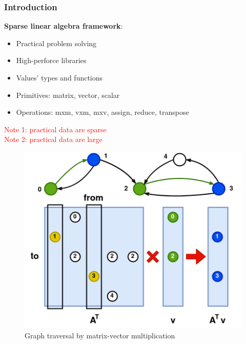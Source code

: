 \documentclass[aspectratio=169,xcolor=table,english]{beamer}
\begin{document}
\begin{frame}[fragile] \frametitle{Introduction}
    \begin{minipage}[m]{0.5\linewidth}
        \textbf{Sparse linear algebra framework}:
        \begin{itemize}
            \item Practical problem solving
            \item High-perforce libraries
            \item Values' types and functions
            \item Primitives: matrix, vector, scalar
            \item Operations: mxm, vxm, mxv, assign, reduce, transpose
        \end{itemize}
        \vspace{0.2cm}
        \textcolor{red}{Note 1: practical data are sparse\\Note 2: practical data are large}
    \end{minipage}\hfill
    \begin{minipage}[m]{0.45\linewidth}
        \begin{figure}
            \centering
            \includegraphics[width=\textwidth]{figures/graph_traversal.png}
            \caption{Graph traversal by matrix-vector multiplication}
            \label{fig:traversal}
        \end{figure}
    \end{minipage}
\end{frame}
\end{document}

